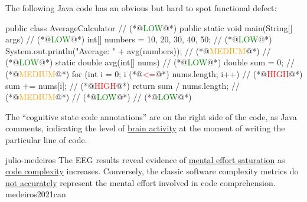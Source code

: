 \documentclass{article}
\begin{document}
The following Java code has an obvious but hard to spot functional defect:
\par
{\scriptsize\begin{ffcode}[columns=flexible]
public class AverageCalculator {                             // (*@\textcolor{green}{LOW}@*)
  public static void main(String[] args) {                   // (*@\textcolor{green}{LOW}@*)
    int[] numbers = {10, 20, 30, 40, 50};                    // (*@\textcolor{green}{LOW}@*)
    System.out.println("Average: " + avg(numbers));          // (*@\textcolor{orange}{MEDIUM}@*)
  }                                                          // (*@\textcolor{green}{LOW}@*)
  static double avg(int[] nums) {                            // (*@\textcolor{green}{LOW}@*)
    double sum = 0;                                          // (*@\textcolor{orange}{MEDIUM}@*)
    for (int i = 0; i (*@\textcolor{red}{<=}@*) nums.length; i++)                   // (*@\textcolor{red}{HIGH}@*)
      sum += nums[i];                                        // (*@\textcolor{red}{HIGH}@*)
    return sum / nums.length;                                // (*@\textcolor{orange}{MEDIUM}@*)
  }                                                          // (*@\textcolor{green}{LOW}@*)
}                                                            // (*@\textcolor{green}{LOW}@*)
\end{ffcode}
}
\par
The ``cognitive state code annotations'' are on the right side of the code, as Java comments, indicating the level of \ul{brain activity} at the moment of writing the particular line of code.
\plush{}

\lnQuote
  {julio-medeiros}
  {The EEG results reveal evidence of \ul{mental effort saturation} as \ul{code complexity} increases. Conversely, the classic software complexity metrics do \ul{not accurately} represent the mental effort involved in code comprehension.}
  {medeiros2021can}
\end{document}
